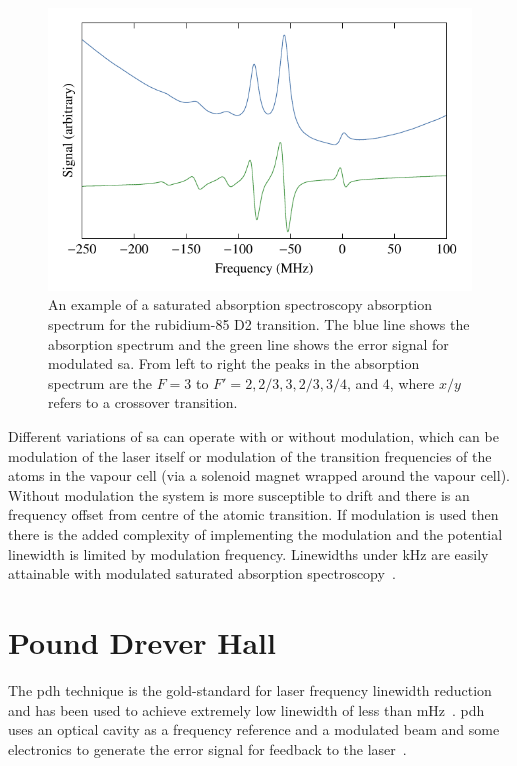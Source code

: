 \begin{figure}
    \center
    \includegraphics{part1/Figs/SatAbsSpectrum.pdf}
    \caption{An example of a saturated absorption spectroscopy absorption spectrum for the rubidium-85 D2 transition.
    The blue line shows the absorption spectrum and the green line shows the error signal for modulated \gls{sa}.
    From left to right the peaks in the absorption spectrum are the $F=3$ to $F'=2,2/3,3,2/3,3/4$, and $4$, where $x/y$ refers to a crossover transition.}
    \label{figure:satabsspectrum}
\end{figure}

Different variations of \gls{sa} can operate with or without modulation, which can be modulation of the laser itself or modulation of the transition frequencies of the atoms in the vapour cell (via a solenoid magnet wrapped around the vapour cell).
Without modulation the system is more susceptible to drift and there is an frequency offset from centre of the atomic transition.
If modulation is used then there is the added complexity of implementing the modulation and the potential linewidth is limited by modulation frequency.
Linewidths under \unit[150]{kHz} are easily attainable with modulated saturated absorption spectroscopy~\cite{saliba_linewidths_2009}.

\section{Pound Drever Hall}

The \gls{pdh} technique is the gold-standard for laser frequency linewidth reduction and has been used to achieve extremely low linewidth of less than \unit[40]{mHz}~\cite{kessler_sub-40-mhz-linewidth_2012}.
\Gls{pdh} uses an optical cavity as a frequency reference and a modulated beam and some electronics to generate the error signal for feedback to the laser~\cite{drever_laser_1983,black_introduction_2000}.

